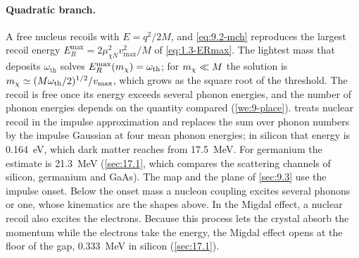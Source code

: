 \paragraph{Quadratic branch.} A free nucleus recoils with $E = q^2/2M$, and \cref{eq:9.2-mch} reproduces the largest recoil energy $E_R^{\mathrm{max}} = 2\mu_{\chi N}^2v_{\mathrm{max}}^2/M$ of \cref{eq:1.3-ERmax}. The lightest mass that deposits $\omega_{\mathrm{th}}$ solves $E_R^{\mathrm{max}}(m_{\chi}) = \omega_{\mathrm{th}}$; for $m_{\chi} \ll M$ the solution is $m_{\chi} \simeq (M\omega_{\mathrm{th}}/2)^{1/2}/v_{\mathrm{max}}$, which grows as the square root of the threshold. The recoil is free once its energy exceeds several phonon energies, and the number of phonon energies depends on the quantity compared (\cref{we:9-place}).  treats nuclear recoil in the impulse approximation and replaces the sum over phonon numbers by the impulse Gaussian at four mean phonon energies; in silicon that energy is \SI{0.164}{eV}, which dark matter reaches from \SI{17.5}{MeV}. For germanium the estimate is \SI{21.3}{MeV} (\cref{sec:17.1}, which compares the scattering channels of silicon, germanium and GaAs). The map and the plane of \cref{sec:9.3} use the impulse onset. Below the onset mass a nucleon coupling excites several phonons or one, whose kinematics are the shapes above. In the Migdal effect, a nuclear recoil also excites the electrons. Because this process lets the crystal absorb the momentum while the electrons take the energy, the Migdal effect opens at the floor of the gap, \SI{0.333}{MeV} in silicon (\cref{sec:17.1}).

